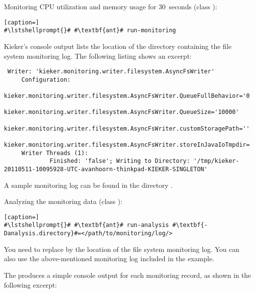 \begin{compactenum}
\item Monitoring CPU utilization and memory usage for 30~seconds (class ):
\setBashListing
\begin{lstlisting}[caption=]
#\lstshellprompt{}# #\textbf{ant}# run-monitoring
\end{lstlisting}

Kieker's console output lists the location of the directory containing the file system %
monitoring log. The following listing shows an excerpt: %

\enlargethispage{1cm}

\setBashListing
\begin{lstlisting}
 Writer: 'kieker.monitoring.writer.filesystem.AsyncFsWriter'
     Configuration:
             kieker.monitoring.writer.filesystem.AsyncFsWriter.QueueFullBehavior='0'
             kieker.monitoring.writer.filesystem.AsyncFsWriter.QueueSize='10000'
             kieker.monitoring.writer.filesystem.AsyncFsWriter.customStoragePath=''
             kieker.monitoring.writer.filesystem.AsyncFsWriter.storeInJavaIoTmpdir='true'
     Writer Threads (1): 
             Finished: 'false'; Writing to Directory: '/tmp/kieker-20110511-10095928-UTC-avanhoorn-thinkpad-KIEKER-SINGLETON'
\end{lstlisting}

A sample monitoring log can be found in the directory .

\item Analyzing the monitoring data (class ):

\setBashListing
\begin{lstlisting}[caption=]
#\lstshellprompt{}# #\textbf{ant}# run-analysis #\textbf{-Danalysis.directory}#=</path/to/monitoring/log/>
\end{lstlisting}

You need to replace  by the location of the file system monitoring log. %
You can also use the above-mentioned monitoring log included in the example. %

The  produces a simple console output for each monitoring record, %
as shown in the following excerpt: 


\end{compactenum}
